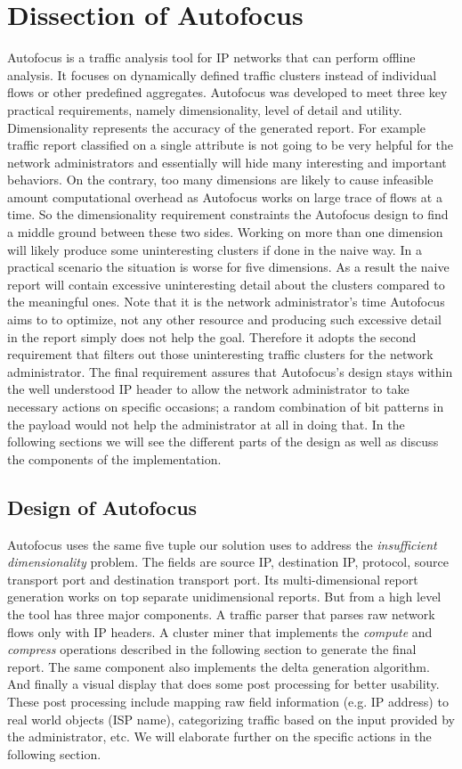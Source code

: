 \documentclass[twocolumn]{article}
\begin{document}
\section{Dissection of Autofocus}
\label{sec:autofocus}
Autofocus \cite{autofocus} is a traffic analysis tool for IP networks that can perform offline analysis. It focuses on dynamically defined traffic clusters instead of individual flows or other predefined aggregates. Autofocus was developed to meet three key practical requirements, namely dimensionality, level of detail and utility. Dimensionality represents the accuracy of the generated report. For example traffic report classified on a single attribute is not going to be very helpful for the network administrators and essentially will hide many interesting and important behaviors. On the contrary, too many dimensions are likely to cause infeasible amount computational overhead as Autofocus works on large trace of flows at a time. So the dimensionality requirement constraints the Autofocus design to find a middle ground between these two sides. Working on more than one dimension will likely produce some uninteresting clusters if done in the naive way. In a practical scenario the situation is worse for five dimensions. As a result the naive report will contain excessive uninteresting detail about the clusters compared to the meaningful ones. Note that it is the network administrator\rq{}s time Autofocus aims to to optimize, not any other resource and producing such excessive detail in the report simply does not help the goal. Therefore it adopts the second requirement that filters out those uninteresting traffic clusters for the network administrator. The final requirement assures that Autofocus\rq{}s design stays within the well understood IP header to allow the network administrator to take necessary actions on specific occasions; a random combination of bit patterns in the payload  would not help the administrator at all in doing that. In the following sections we will see the different parts of the design as well as discuss the components of the implementation.

\subsection{Design of Autofocus}
Autofocus uses the same five tuple our solution uses to address the \emph{insufficient dimensionality} problem. The fields are source IP, destination IP, protocol, source transport port and destination transport port. Its multi-dimensional report generation works on top separate unidimensional reports. But from a high level the tool has three major components. A traffic parser that parses raw network flows only with IP headers. A cluster miner that implements the \emph{compute} and \emph{compress} operations described in the following section to generate the final report. The same component also implements the delta generation algorithm. And finally a visual display that does some post processing for better usability. These post processing include mapping raw field information (e.g. IP address) to real world objects (ISP name), categorizing traffic based on the input provided by the administrator, etc. We will elaborate further on the specific actions in the following section.
\end{document}

